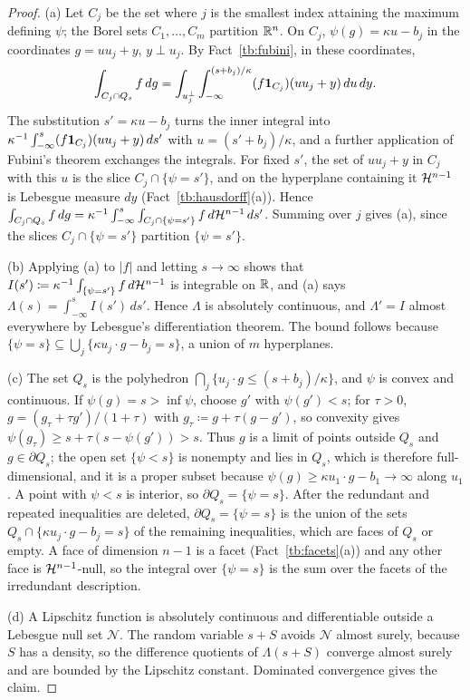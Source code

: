 \documentclass[11pt,letterpaper]{article}
\theoremstyle{plain}
\begin{document}
\begin{proof}
(a) Let \(C_j\) be the set where \(j\) is the smallest index attaining the
maximum defining \(\psi\); the Borel sets \(C_1,\ldots,C_m\) partition
\(\mathbb R^n\). On \(C_j\), \(\psi(g)=\kappa u-b_j\) in the coordinates
\(g=u u_j+y\), \(y\perp u_j\). By Fact~\ref{tb:fubini}, in these coordinates,
\[
 \int_{C_j\cap Q_s}f\,dg=\int_{u_j^\perp}\int_{-\infty}^{(s+b_j)/\kappa}
 (f\mathbf 1_{C_j})(u u_j+y)\,du\,dy .
\]
The substitution \(s'=\kappa u-b_j\) turns the inner integral into
\(\kappa^{-1}\int_{-\infty}^s(f\mathbf 1_{C_j})(u u_j+y)\,ds'\) with
\(u=(s'+b_j)/\kappa\), and a further application of Fubini's theorem
exchanges the integrals. For fixed \(s'\), the set of \(u u_j+y\) in \(C_j\)
with this \(u\) is the slice \(C_j\cap\{\psi=s'\}\), and on the hyperplane
containing it \(\mathcal H^{n-1}\) is Lebesgue measure \(dy\)
(Fact~\ref{tb:hausdorff}(a)). Hence
\(\int_{C_j\cap Q_s}f\,dg=\kappa^{-1}\int_{-\infty}^s\int_{C_j\cap\{\psi=s'\}}
f\,d\mathcal H^{n-1}\,ds'\). Summing over \(j\) gives (a), since the slices
\(C_j\cap\{\psi=s'\}\) partition \(\{\psi=s'\}\).

(b) Applying (a) to \(|f|\) and letting \(s\to\infty\) shows that
\(I(s')\coloneqq \kappa^{-1}\int_{\{\psi=s'\}}f\,d\mathcal H^{n-1}\) is integrable on
\(\mathbb R\), and (a) says \(\Lambda(s)=\int_{-\infty}^sI(s')\,ds'\). Hence \(\Lambda\) is
absolutely continuous, and \(\Lambda'=I\) almost everywhere by Lebesgue's
differentiation theorem. The bound follows because
\(\{\psi=s\}\subseteq\bigcup_j\{\kappa u_j\cdot g-b_j=s\}\), a union of \(m\)
hyperplanes.

(c) The set \(Q_s\) is the polyhedron \(\bigcap_j\{u_j\cdot g\le(s+b_j)/\kappa\}\),
and \(\psi\) is convex and continuous. If \(\psi(g)=s>\inf\psi\), choose \(g'\)
with \(\psi(g')<s\); for \(\tau>0\), \(g=(g_\tau+\tau g')/(1+\tau)\) with
\(g_\tau\coloneqq g+\tau(g-g')\), so convexity gives
\(\psi(g_\tau)\ge s+\tau(s-\psi(g'))>s\). Thus \(g\) is a limit of points
outside \(Q_s\) and \(g\in\partial Q_s\); the open set \(\{\psi<s\}\) is
nonempty and lies in \(Q_s\), which is therefore full-dimensional, and it
is a proper subset because \(\psi(g)\ge\kappa u_1\cdot g-b_1\to\infty\) along
\(u_1\). A point with \(\psi<s\) is interior, so \(\partial Q_s=\{\psi=s\}\). After
the redundant and repeated inequalities are deleted, \(\partial Q_s=\{\psi=s\}\)
is the union of the sets \(Q_s\cap\{\kappa u_j\cdot g-b_j=s\}\) of the
remaining inequalities, which are faces of \(Q_s\) or empty. A face of
dimension \(n-1\) is a facet (Fact~\ref{tb:facets}(a)) and any other face is
\(\mathcal H^{n-1}\)-null, so the integral over \(\{\psi=s\}\) is the sum over the
facets of the irredundant description.

(d) A Lipschitz function is absolutely continuous and differentiable outside a
Lebesgue null set \(\mathcal N\). The random variable \(s+S\) avoids
\(\mathcal N\) almost surely, because \(S\) has a density, so the difference
quotients of \(\Lambda(s+S)\) converge almost surely and are bounded by the
Lipschitz constant. Dominated convergence gives the claim.
\end{proof}
\end{document}
